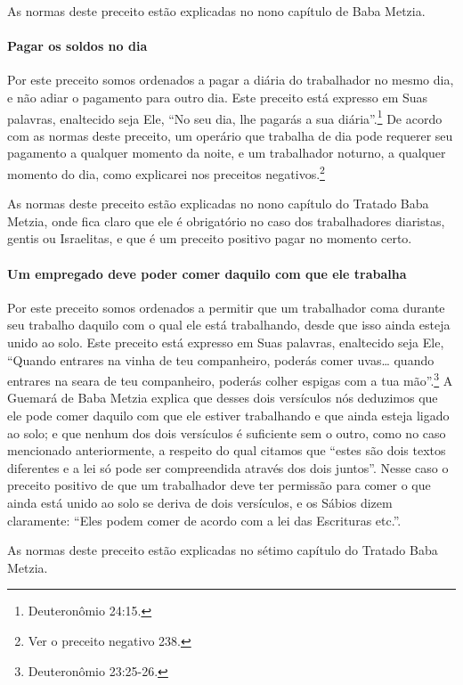 As normas deste preceito estão explicadas no nono capítulo de Baba
Metzia.

\paragraph{Pagar os soldos no dia}

Por este preceito somos ordenados a pagar a diária do trabalhador no
mesmo dia, e não adiar o pagamento para outro dia. Este preceito está
expresso em Suas palavras, enaltecido seja Ele, ``No seu dia, lhe
pagarás a sua diária''.\footnote{Deuteronômio 24:15.} De acordo com as normas
deste preceito, um operário que trabalha de dia pode requerer seu
pagamento a qualquer momento da noite, e um trabalhador noturno, a
qualquer momento do dia, como explicarei nos preceitos
negativos.\footnote{Ver o preceito negativo 238.}

As normas deste preceito estão explicadas no nono capítulo do Tratado
Baba Metzia, onde fica claro que ele é obrigatório no caso dos
trabalhadores diaristas, gentis ou Israelitas, e que é um preceito
positivo pagar no momento certo.

\paragraph{Um empregado deve poder comer daquilo com que ele trabalha}

Por este preceito somos ordenados a permitir que um trabalhador coma
durante seu trabalho daquilo com o qual ele está trabalhando, desde que
isso ainda esteja unido ao solo. Este preceito está expresso em Suas
palavras, enaltecido seja Ele, ``Quando entrares na vinha de teu
companheiro, poderás comer uvas\ldots{} quando entrares na seara de teu
companheiro, poderás colher espigas com a tua mão''.\footnote{Deuteronômio
23:25-26.} A Guemará de Baba Metzia explica que desses dois versículos
nós deduzimos que ele pode comer daquilo com que ele estiver trabalhando
e que ainda esteja ligado ao solo; e que nenhum dos dois versículos é
suficiente sem o outro, como no caso mencionado
anteriormente, a respeito do qual citamos que ``estes são dois textos
diferentes e a lei só pode ser compreendida através dos dois juntos''.
Nesse caso o preceito positivo de que um trabalhador deve ter permissão
para comer o que ainda está unido ao solo se deriva de dois versículos,
e os Sábios dizem claramente: ``Eles podem comer de acordo com a lei das
Escrituras etc.''.

As normas deste preceito estão explicadas no sétimo capítulo do Tratado Baba Metzia.

